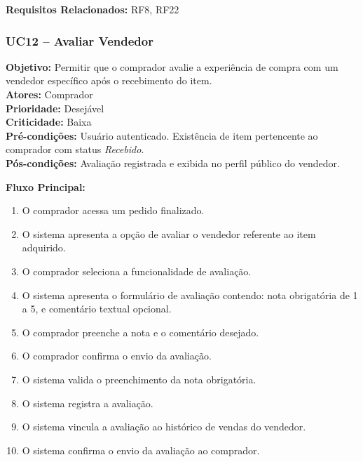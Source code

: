 ﻿\documentclass[12pt,a4paper]{article}
\begin{document}
\vspace{0.5em}
\noindent\textbf{Requisitos Relacionados:} RF8, RF22


\subsubsection{UC12 – Avaliar Vendedor}
\label{uc:12}
\noindent\textbf{Objetivo:} Permitir que o comprador avalie a experiência de compra com um vendedor específico após o recebimento do item.\\
\textbf{Atores:} Comprador\\
\textbf{Prioridade:} Desejável\\
\textbf{Criticidade:} Baixa\\
\textbf{Pré-condições:} Usuário autenticado. Existência de item pertencente ao comprador com status \textit{Recebido}.\\
\textbf{Pós-condições:} Avaliação registrada e exibida no perfil público do vendedor.

\vspace{0.5em}
\noindent\textbf{Fluxo Principal:}
\begin{enumerate}[label=\arabic*.]
    \item O comprador acessa um pedido finalizado.
    \item O sistema apresenta a opção de avaliar o vendedor referente ao item adquirido.
    \item O comprador seleciona a funcionalidade de avaliação.
    \item O sistema apresenta o formulário de avaliação contendo: nota obrigatória de 1 a 5, e comentário textual opcional.
    \item O comprador preenche a nota e o comentário desejado.
    \item O comprador confirma o envio da avaliação.
    \item O sistema valida o preenchimento da nota obrigatória.
    \item O sistema registra a avaliação.
    \item O sistema vincula a avaliação ao histórico de vendas do vendedor.
    \item O sistema confirma o envio da avaliação ao comprador.
\end{enumerate}
\end{document}
